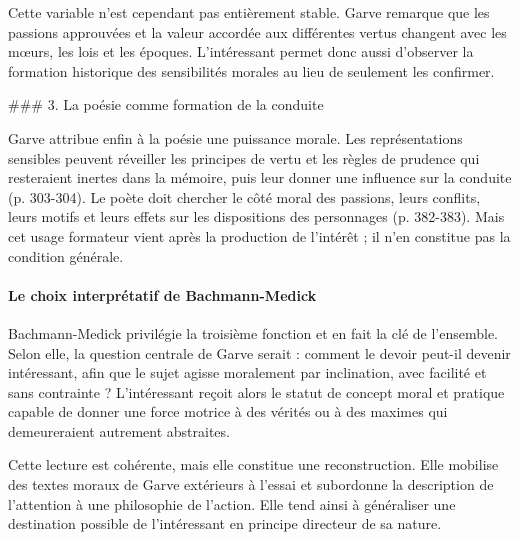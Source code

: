 \documentclass[10pt,a4paper]{article}
\begin{document}
Cette variable n'est cependant pas entièrement stable. Garve remarque que les passions approuvées et la valeur accordée aux différentes vertus changent avec les mœurs, les lois et les époques. L'intéressant permet donc aussi d'observer la formation historique des sensibilités morales au lieu de seulement les confirmer.

\#\#\# 3. La poésie comme formation de la conduite

Garve attribue enfin à la poésie une puissance morale. Les représentations sensibles peuvent réveiller les principes de vertu et les règles de prudence qui resteraient inertes dans la mémoire, puis leur donner une influence sur la conduite (p. 303-304). Le poète doit chercher le côté moral des passions, leurs conflits, leurs motifs et leurs effets sur les dispositions des personnages (p. 382-383). Mais cet usage formateur vient après la production de l'intérêt ; il n'en constitue pas la condition générale.

\paragraph{Le choix interprétatif de Bachmann-Medick}
Bachmann-Medick privilégie la troisième fonction et en fait la clé de l'ensemble. Selon elle, la question centrale de Garve serait : comment le devoir peut-il devenir intéressant, afin que le sujet agisse moralement par inclination, avec facilité et sans contrainte ? L'intéressant reçoit alors le statut de concept moral et pratique capable de donner une force motrice à des vérités ou à des maximes qui demeureraient autrement abstraites.

Cette lecture est cohérente, mais elle constitue une reconstruction. Elle mobilise des textes moraux de Garve extérieurs à l'essai et subordonne la description de l'attention à une philosophie de l'action. Elle tend ainsi à généraliser une destination possible de l'intéressant en principe directeur de sa nature.
\end{document}
